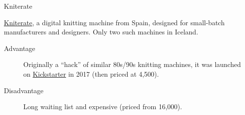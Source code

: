 \documentclass[
    NAME={Dr. Helga Ingimundardóttir},
    EMAIL={helgaingim@hi.is},
    FACULTY={Industrial Engineering},
    TITLE={HiDef Textiles: Reviving Tradition with Innovation},
    SUBTITLE={Empowering Creativity and Sustainability in Textile Production through Digital Transformation},
    SEMINAR={Reykjavík DataBeers},
    DATE={January 25, 2025},
    WIDE={true}
]{HI-LaTeX/hi-beamer}
\begin{document}
    \begin{frame}{Kniterate}

        \href{https://www.kniterate.com/product/kniterate-the-digital-knitting-machine/}{Kniterate}, a digital knitting machine from Spain, designed for small-batch manufacturers and designers. Only two such machines in Iceland.

        \begin{description}
            \item[Advantage] Originally a ``hack'' of similar 80s/90s knitting machines, it was launched on \href{https://www.kickstarter.com/projects/kniterate/kniterate-the-digital-knitting-machine/}{Kickstarter} in 2017 (then priced at \texteuro{}4,500).
            \item[Disadvantage] Long waiting list and expensive (priced from \texteuro{}16,000).
        \end{description}


\end{frame}
\end{document}
